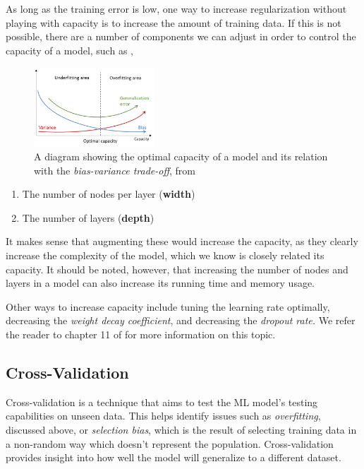 \documentclass{article}
\begin{document}
  As long as the training error is low, one way to increase regularization without playing with capacity is to increase the amount of training data. If this is not possible, there are a number of components we can adjust in order to control the capacity of a model, such as \citep{capacity-Brownlee}, 
\begin{figure} %
    \centering
    \label{capacity}
    \includegraphics[width=0.4\textwidth]{capacity}
    \caption{A diagram showing the optimal capacity of a model and its relation with the \textit{bias-variance trade-off}, from \citep{capacity-Kowalik}}
\end{figure}
  \begin{enumerate}
    \item The number of nodes per layer (\textbf{width}) 
    \item The number of layers (\textbf{depth})
  \end{enumerate}
  It makes sense that augmenting these would increase the capacity, as they clearly increase the complexity of the model, which we know is closely related its capacity. It should be noted, however, that increasing the number of nodes and layers in a model can also increase its running time and memory usage. 

  Other ways to increase capacity include tuning the learning rate optimally, decreasing the \textit{weight decay coefficient}, and decreasing the \textit{dropout rate.} We refer the reader to chapter 11 of \cite{Goodfellow-et-al-2016} for more information on this topic.

  \subsection{Cross-Validation}%
  \label{sub:Cross-Validation}
Cross-validation is a technique that aims to test the ML model's testing capabilities on unseen data. This helps identify issues such as \textit{overfitting}, discussed above, or \textit{selection bias}, which is the result of selecting training data in a non-random way which doesn't represent the population. Cross-validation provides insight into how well the model will generalize to a different dataset.
\end{document}
